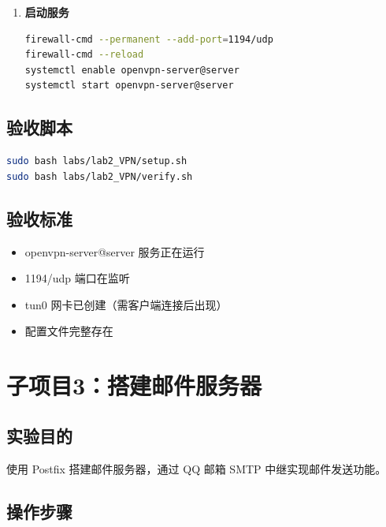 \documentclass[12pt,a4paper]{ctexart}
\begin{document}
\begin{enumerate}[label=\arabic*.,leftmargin=*]
  \item \textbf{启动服务}

  \begin{cmdbox}
  \begin{lstlisting}[language=bash]
firewall-cmd --permanent --add-port=1194/udp
firewall-cmd --reload
systemctl enable openvpn-server@server
systemctl start openvpn-server@server
  \end{lstlisting}
  \end{cmdbox}

\end{enumerate}

\subsection{验收脚本}

\begin{cmdbox}
\begin{lstlisting}[language=bash]
sudo bash labs/lab2_VPN/setup.sh
sudo bash labs/lab2_VPN/verify.sh
\end{lstlisting}
\end{cmdbox}

\subsection{验收标准}

\begin{itemize}
  \item openvpn-server@server 服务正在运行
  \item 1194/udp 端口在监听
  \item tun0 网卡已创建（需客户端连接后出现）
  \item 配置文件完整存在
\end{itemize}

\newpage
\section{子项目3：搭建邮件服务器}

\subsection{实验目的}

使用 Postfix 搭建邮件服务器，通过 QQ 邮箱 SMTP 中继实现邮件发送功能。

\subsection{操作步骤}
\end{document}

